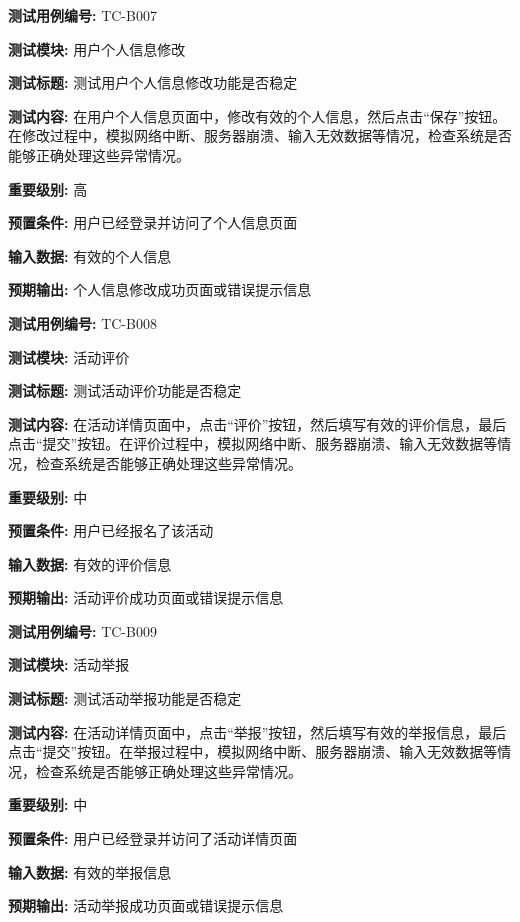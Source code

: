 \begin{framed} \textbf{测试用例编号:} TC-B007

\textbf{测试模块:} 用户个人信息修改

\textbf{测试标题:} 测试用户个人信息修改功能是否稳定

\textbf{测试内容:} 在用户个人信息页面中，修改有效的个人信息，然后点击“保存”按钮。在修改过程中，模拟网络中断、服务器崩溃、输入无效数据等情况，检查系统是否能够正确处理这些异常情况。

\textbf{重要级别:} 高

\textbf{预置条件:} 用户已经登录并访问了个人信息页面

\textbf{输入数据:} 有效的个人信息

\textbf{预期输出:} 个人信息修改成功页面或错误提示信息

\begin{center}  \end{center} \end{framed}

\begin{framed} \textbf{测试用例编号:} TC-B008

\textbf{测试模块:} 活动评价

\textbf{测试标题:} 测试活动评价功能是否稳定

\textbf{测试内容:} 在活动详情页面中，点击“评价”按钮，然后填写有效的评价信息，最后点击“提交”按钮。在评价过程中，模拟网络中断、服务器崩溃、输入无效数据等情况，检查系统是否能够正确处理这些异常情况。

\textbf{重要级别:} 中

\textbf{预置条件:} 用户已经报名了该活动

\textbf{输入数据:} 有效的评价信息

\textbf{预期输出:} 活动评价成功页面或错误提示信息

\begin{center}  \end{center} \end{framed}

\begin{framed} \textbf{测试用例编号:} TC-B009

\textbf{测试模块:} 活动举报

\textbf{测试标题:} 测试活动举报功能是否稳定

\textbf{测试内容:} 在活动详情页面中，点击“举报”按钮，然后填写有效的举报信息，最后点击“提交”按钮。在举报过程中，模拟网络中断、服务器崩溃、输入无效数据等情况，检查系统是否能够正确处理这些异常情况。

\textbf{重要级别:} 中

\textbf{预置条件:} 用户已经登录并访问了活动详情页面

\textbf{输入数据:} 有效的举报信息

\textbf{预期输出:} 活动举报成功页面或错误提示信息

\begin{center}  \end{center} \end{framed}

